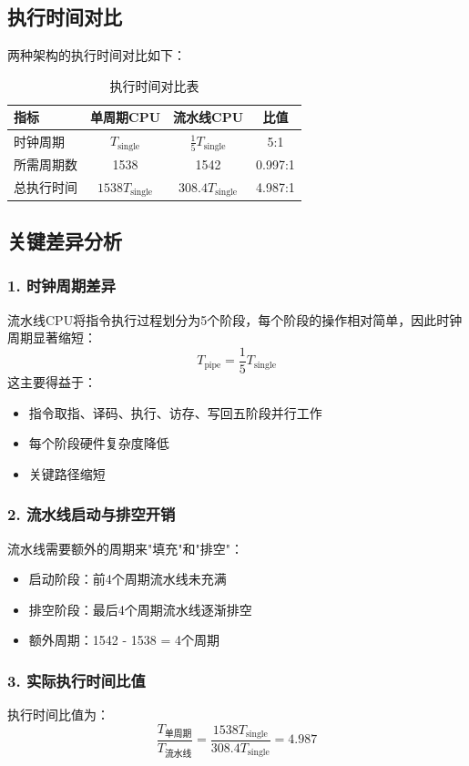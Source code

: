 \documentclass[12pt,a4paper]{article}
\begin{document}
\subsection{执行时间对比}
两种架构的执行时间对比如下：

\begin{table}[ht]
\centering
\begin{tabular}{lccc}
\hline
\textbf{指标} & \textbf{单周期CPU} & \textbf{流水线CPU} & \textbf{比值} \\
\hline
时钟周期 & $T_{\text{single}}$ & $\frac{1}{5}T_{\text{single}}$ & 5:1 \\
所需周期数 & 1538 & 1542 & 0.997:1 \\
总执行时间 & $1538T_{\text{single}}$ & $308.4T_{\text{single}}$ & 4.987:1 \\
\hline
\end{tabular}
\caption{执行时间对比表}
\end{table}

\subsection{关键差异分析}

\subsubsection{1. 时钟周期差异}
流水线CPU将指令执行过程划分为5个阶段，每个阶段的操作相对简单，因此时钟周期显著缩短：
\[
T_{\text{pipe}} = \frac{1}{5}T_{\text{single}}
\]
这主要得益于：
\begin{itemize}
    \item 指令取指、译码、执行、访存、写回五阶段并行工作
    \item 每个阶段硬件复杂度降低
    \item 关键路径缩短
\end{itemize}

\subsubsection{2. 流水线启动与排空开销}
流水线需要额外的周期来"填充"和"排空"：
\begin{itemize}
    \item 启动阶段：前4个周期流水线未充满
    \item 排空阶段：最后4个周期流水线逐渐排空
    \item 额外周期：1542 - 1538 = 4个周期
\end{itemize}

\subsubsection{3. 实际执行时间比值}
执行时间比值为：
\[
\frac{T_{\text{单周期}}}{T_{\text{流水线}}} = \frac{1538T_{\text{single}}}{308.4T_{\text{single}}} = 4.987
\]
\end{document}
